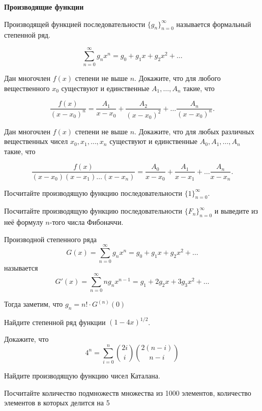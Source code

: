 \documentclass{article}
\begin{document}
    \large


    \begin{center}
        \textbf{Производящие функции}
    \end{center}

    Производящей функцией последовательности $\{g_n\}_{n = 0}^{\infty}$ называется формальный степенной ряд.

    \[\sum_{n = 0}^{\infty}g_{n}x^n = g_0 + g_{1}x + g_{2}x^2 + \dotsc\]
    \begin{enumerate_boxed}

        \item Дан многочлен $f(x)$ степени не выше $n$.
        Докажите, что для любого вещественного $x_0$ существуют и единственные $A_1, \dotsc , A_n$ такие, что

        \[\frac{f(x)}{(x - x_0)^n} = \frac{A_1}{x-x_0} + \frac{A_2}{(x-x_0)^2} + \dotsc \frac{A_n}{(x-x_0)^n}.\]

        \item Дан многочлен $f(x)$ степени не выше $n$.
        Докажите, что для любых различных вещественных чисел $x_0, x_1, \dotsc, x_n$ существуют и единственные $A_0, A_1, \dotsc , A_n$ такие, что

        \[\frac{f(x)}{(x - x_0)(x-x_1)\dotsc(x-x_n)} = \frac{A_0}{x-x_0} + \frac{A_1}{x-x_1} + \dotsc \frac{A_n}{x-x_n}.\]

        \item Посчитайте производящую функцию последовательности $\{1\}_{n = 0}^{\infty}$.

        \item Посчитайте производящую функцию последовательности $\{F_n\}_{n = 0}^{\infty}$ и выведите из неё формулу $n$-того числа Фибоначчи.

        Производной степенного ряда
        \[G(x) = \sum_{n = 0}^{\infty}g_{n}x^n = g_0 + g_{1}x + g_{2}x^2 + \dotsc\]
        называется
        \[G'(x) = \sum_{n = 0}^{\infty}ng_{n}x^{n-1} = g_1 + 2g_{2}x + 3g_{3}x^2 + \dotsc\]

        Тогда заметим, что $g_n = n! \cdot G^{(n)}(0)$

        \item Найдите степенной ряд функции $(1 - 4x)^{1/2}$.

        \item Докажите, что \[4^n = \sum_{i = 0}^n \binom{2i}{i} \binom{2(n-i)}{n-i}\]

        \item Найдите производящую функцию чисел Каталана.

        \item Посчитайте количество подмножеств множества из 1000 элементов, количество элементов в которых делится на 5


    \end{enumerate_boxed}
\end{document}
